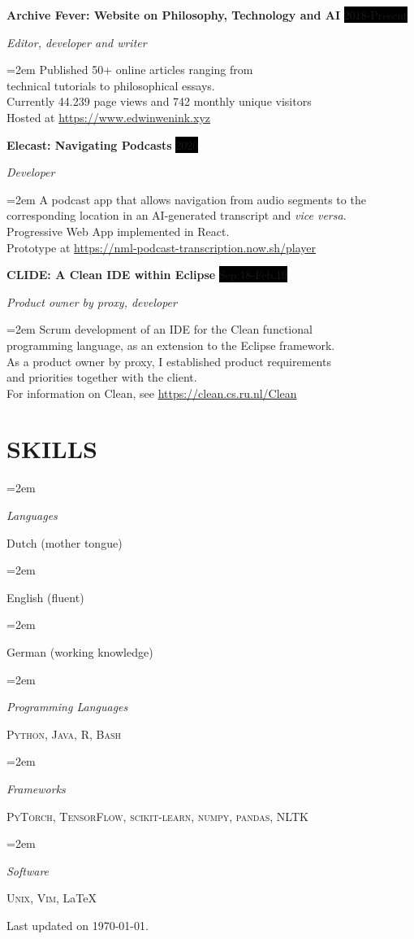 \documentclass{article}
\newlength{\spacebox}
\newcommand{\sepspace}{\vspace*{1em}}		%
\newcommand{\NewPart}[1]{\section*{\uppercase{#1}}}
\newcommand{\PersonalEntry}[2]{
		\noindent\hangindent=2em\hangafter=0 %
		\parbox{\spacebox}{        %
		\textit{#1}}		       %
		\hspace{1.5em} #2 \par}    %
\newcommand{\SkillsEntry}[2]{      %
		\noindent\hangindent=2em\hangafter=0 %
		\parbox{\spacebox}{        %
		\textit{#1}}			   %
		\hspace{1.5em} #2 \par}    %
\newcommand{\EducationEntry}[4]{
		\noindent \textbf{#1} \hfill      %
		\colorbox{Black}{%
			\parbox{6em}{%
			\hfill\color{White}#2}} \par  %
		\noindent \textit{#3} \par        %
		\noindent\hangindent=2em\hangafter=0 \small #4 %
		\normalsize \par}
\newcommand{\WorkEntry}[4]{				  %
		\noindent \textbf{#1} \hfill      %
		\colorbox{Black}{\color{White}#2} \par  %
		\noindent \textit{#3} \par              %
		\noindent\hangindent=2em\hangafter=0 \small #4 %
		\normalsize \par}
\begin{document}
\WorkEntry{Archive Fever: Website on Philosophy, Technology and AI}{2018-Present}{Editor, developer and writer}{Published 50+ online articles ranging from\\
	technical tutorials to philosophical essays.\\
	Currently 44.239 page views and 742 monthly unique visitors\\
	Hosted at \url{https://www.edwinwenink.xyz}
}
\sepspace

\WorkEntry{Elecast: Navigating Podcasts}{2020}{Developer}{A podcast app that allows navigation from audio segments to the\\ corresponding location in an AI-generated transcript and \textit{vice versa}.\\
Progressive Web App implemented in React.\\
Prototype at \url{https://nml-podcast-transcription.now.sh/player}}
\sepspace

\WorkEntry{CLIDE: A Clean IDE within Eclipse}{Sep.18-Feb.19}{Product owner by proxy, developer}{Scrum development of an IDE for the Clean functional\\ 
programming language, as an extension to the Eclipse framework.\\
As a product owner by proxy, I established product requirements\\
and priorities together with the client. \\
For information on Clean, see \url{https://clean.cs.ru.nl/Clean}}
\sepspace


\NewPart{Skills}{}

\SkillsEntry{Languages}{Dutch (mother tongue)}
\SkillsEntry{}{English (fluent)}
\SkillsEntry{}{German (working knowledge)}
\sepspace

\SkillsEntry{Programming Languages}{\textsc{Python}, \textsc{Java}, \textsc{R}, \textsc{Bash}}
\sepspace

\SkillsEntry{Frameworks}{\textsc{PyTorch}, \textsc{TensorFlow}, \textsc{scikit-learn}, \textsc{numpy}, \textsc{pandas}, \textsc{NLTK}}
\sepspace

\SkillsEntry{Software}{\textsc{Unix}, \textsc{Vim}, \LaTeX}
\sepspace


\vspace*{\fill}
\small Last updated on \today.
\end{document}
